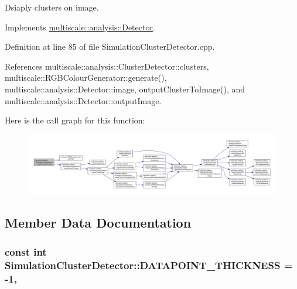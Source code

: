 Dsiaply clusters on image. 



Implements \hyperlink{classmultiscale_1_1analysis_1_1Detector_a5d10b68605d5a1711527b4b896b3b2cc}{multiscale\-::analysis\-::\-Detector}.



Definition at line 85 of file Simulation\-Cluster\-Detector.\-cpp.



References multiscale\-::analysis\-::\-Cluster\-Detector\-::clusters, multiscale\-::\-R\-G\-B\-Colour\-Generator\-::generate(), multiscale\-::analysis\-::\-Detector\-::image, output\-Cluster\-To\-Image(), and multiscale\-::analysis\-::\-Detector\-::output\-Image.



Here is the call graph for this function\-:\nopagebreak
\begin{figure}[H]
\begin{center}
\leavevmode
\includegraphics[width=350pt]{classmultiscale_1_1analysis_1_1SimulationClusterDetector_a909e1e53836f1688ebe312c5f7fb70b5_cgraph}
\end{center}
\end{figure}




\subsection{Member Data Documentation}
\hypertarget{classmultiscale_1_1analysis_1_1SimulationClusterDetector_a530922a3fad1e612062d17d07e2dc763}{
\subsubsection[{D\-A\-T\-A\-P\-O\-I\-N\-T\-\_\-\-T\-H\-I\-C\-K\-N\-E\-S\-S}]{\setlength{\rightskip}{0pt plus 5cm}const int Simulation\-Cluster\-Detector\-::\-D\-A\-T\-A\-P\-O\-I\-N\-T\-\_\-\-T\-H\-I\-C\-K\-N\-E\-S\-S = -\/1\hspace{0.3cm}{\ttfamily [static]}, {\ttfamily [private]}}}\label{classmultiscale_1_1analysis_1_1SimulationClusterDetector_a530922a3fad1e612062d17d07e2dc763}


